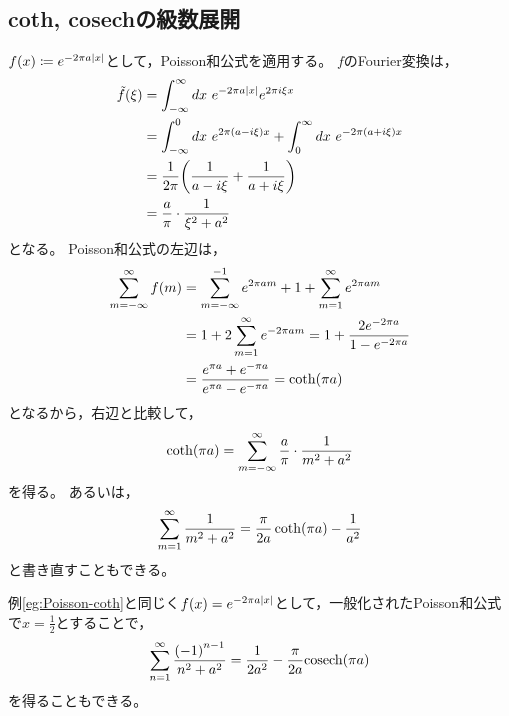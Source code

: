 \documentclass[a4paper,draft]{ltjsarticle}
\begin{document}
\subsection{coth, cosechの級数展開}
\begin{eg}\label{eg:Poisson-coth}
    $\fun{f}{x}\coloneqq e^{-2\pi a\abs{x}}$として，Poisson和公式を適用する。
    $f$のFourier変換は，
    \begin{align}
        \fun{\tilde{f}}{\xi}&=\int_{-\infty}^\infty dx\ e^{-2\pi a\abs{x}}e^{2\pi i \xi x}
        \\
        &=\int_{-\infty}^0 dx\ e^{2\pi\spare{a-i\xi}x}
        +\int_0^\infty dx\ e^{-2\pi\spare{a+i\xi}x}
        \\
        &=\dfrac{1}{2\pi}\pare{\dfrac{1}{a-i\xi}+\dfrac{1}{a+i\xi}}
        \\
        &=\dfrac{a}{\pi}\cdot\dfrac{1}{\xi^2+a^2}
    \end{align}
    となる。
    Poisson和公式の左辺は，
    \begin{align}
        \sum_{m=-\infty}^\infty \fun{f}{m}
        &=\sum_{m=-\infty}^{-1}e^{2\pi a m}
        + 1
        + \sum_{m=1}^\infty e^{2\pi a m}
        \\
        &= 1 + 2\sum_{m=1}^\infty e^{-2\pi am}
        = 1 + \dfrac{2e^{-2\pi a}}{1-e^{-2\pi a}}
        \\
        &=\dfrac{e^{\pi a}+e^{-\pi a}}{e^{\pi a}-e^{-\pi a}}=\fun{\coth}{\pi a}
    \end{align}
    となるから，右辺と比較して，
    \begin{equation}
        \fun{\coth}{\pi a}=\sum_{m=-\infty}^\infty \dfrac{a}{\pi}\cdot\dfrac{1}{m^2+a^2}
    \end{equation}
    を得る。
    あるいは，
    \begin{equation}
        \sum_{m=1}^\infty \dfrac{1}{m^2+a^2}=\dfrac{\pi}{2a}\fun{\coth}{\pi a}-\dfrac{1}{a^2}
    \end{equation}
    と書き直すこともできる。
\end{eg}

\begin{eg}\label{eg:cosech}
    例\ref{eg:Poisson-coth}と同じく$\fun{f}{x}=e^{-2\pi a\abs{x}}$として，一般化されたPoisson和公式で$x=\frac{1}{2}$とすることで，
    \begin{equation}
        \sum_{n=1}^\infty \dfrac{\pare{-1}^{n-1}}{n^2+a^2}
        =\dfrac{1}{2a^2}-\dfrac{\pi}{2a}\fun{\cosech}{\pi a}
    \end{equation}
    を得ることもできる。
\end{eg}
\end{document}
